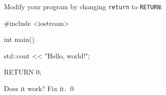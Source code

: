 Modify your program by changing \verb!return! to \verb!RETURN!:
\begin{console}
#include <iostream>

int main()
{
    std::cout << "Hello, world!\n";

    RETURN 0;
}
\end{console}
Does it work? Fix it.
\qed
